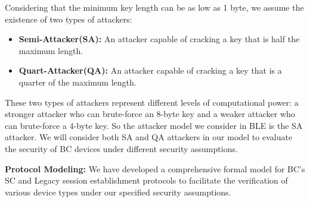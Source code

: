 \documentclass[../main.tex]{subfiles}  %
\begin{document}
Considering that the minimum key length can be as low as 1 byte, we assume the existence of two types of attackers:
\begin{itemize}[leftmargin=*]
    \item \textbf{Semi-Attacker(SA):} An attacker capable of cracking a key that is half the maximum length.
    \item \textbf{Quart-Attacker(QA):} An attacker capable of cracking a key that is a quarter of the maximum length.
\end{itemize}
These two types of attackers represent different levels of computational power: a stronger attacker who can brute-force an 8-byte key and a weaker attacker who can brute-force a 4-byte key.
So the attacker model we consider in BLE is the SA attacker.
We will consider both SA and QA attackers in our model to evaluate the security of BC devices under different security assumptions.

\noindent
\textbf{Protocol Modeling:}
We have developed a comprehensive formal model for BC's SC and Legacy session establishment protocols to facilitate the verification of various device types under our specified security assumptions.
\end{document}
